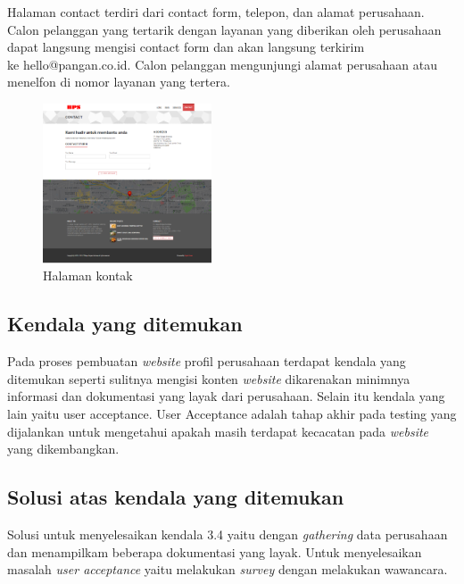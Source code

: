 Halaman contact terdiri dari contact form, telepon, dan alamat perusahaan. 
Calon pelanggan yang tertarik dengan layanan yang diberikan oleh perusahaan dapat langsung mengisi 
contact form dan akan langsung terkirim \\ke hello@pangan.co.id.  
Calon pelanggan mengunjungi alamat perusahaan atau menelfon di nomor layanan yang tertera.

\begin{figure}[htbp]
    \begin{center}
    \includegraphics[width=5cm]{img/scr-website-contact.png}
    \caption{Halaman kontak}
    \label{gambar:scr-website-contact}
    \end{center}
\end{figure}

\subsection{Kendala yang ditemukan}

Pada proses pembuatan \emph{website} profil perusahaan terdapat kendala yang ditemukan 
seperti sulitnya mengisi konten \emph{website} dikarenakan minimnya informasi dan 
dokumentasi yang layak dari perusahaan. Selain itu kendala yang lain yaitu user acceptance. 
User Acceptance adalah tahap akhir pada testing yang 
dijalankan untuk mengetahui apakah masih terdapat kecacatan pada \emph{website} yang dikembangkan.

\subsection{Solusi atas kendala yang ditemukan}
Solusi untuk menyelesaikan kendala 3.4 yaitu dengan \emph{gathering} data perusahaan dan 
menampilkam beberapa dokumentasi yang layak. 
Untuk menyelesaikan masalah \emph{user acceptance} yaitu melakukan \emph{survey} dengan melakukan wawancara. 
